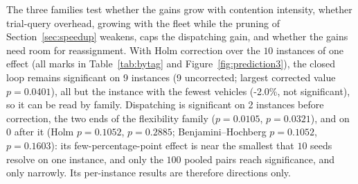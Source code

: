 \documentclass[manuscript,screen,review]{acmart}
\newcommand{\NCases}{10}
\newcommand{\NSeeds}{10}
\newcommand{\NPairs}{100}
\newcommand{\CellsSigLoop}{9}
\newcommand{\CellsSigLoopAdj}{9}
\newcommand{\CellsSigProbe}{2}
\newcommand{\CellsSigProbeAdj}{0}
\newcommand{\GainLoopStarve}{-2.0\%}     %
\newcommand{\PProbeFlexLoRaw}{=0.0105}
\newcommand{\PProbeFlexLoHolm}{=0.1052}
\newcommand{\PProbeFlexLoBH}{=0.1052}
\newcommand{\PProbeFlexHiRaw}{=0.0321}
\newcommand{\PProbeFlexHiHolm}{=0.2885}
\newcommand{\PProbeFlexHiBH}{=0.1603}
\newcommand{\PLoopCellMax}{=0.0401}
\begin{document}
The three families test whether the gains grow with contention intensity, whether trial-query overhead, growing with the fleet while the pruning of Section~\ref{sec:speedup} weakens, caps the dispatching gain, and whether the gains need room for reassignment.
With Holm correction over the $\NCases$ instances of one effect (all marks in Table~\ref{tab:bytag} and Figure~\ref{fig:prediction3}), the closed loop remains significant on \CellsSigLoopAdj{} instances (\CellsSigLoop{} uncorrected; largest corrected value $p\PLoopCellMax$), all but the instance with the fewest vehicles (\GainLoopStarve{}, not significant), so it can be read by family.
Dispatching is significant on \CellsSigProbe{} instances before correction, the two ends of the flexibility family ($p\PProbeFlexLoRaw$, $p\PProbeFlexHiRaw$), and on \CellsSigProbeAdj{} after it (Holm $p\PProbeFlexLoHolm$, $p\PProbeFlexHiHolm$; Benjamini--Hochberg $p\PProbeFlexLoBH$, $p\PProbeFlexHiBH$): its few-percentage-point effect is near the smallest that $\NSeeds$ seeds resolve on one instance, and only the $\NPairs$ pooled pairs reach significance, and only narrowly.
Its per-instance results are therefore directions only.

\begin{table}[t]
\caption{Per-instance ladder results and the two effects, by family ($n=\NSeeds$ seed pairs per instance). Marks: Holm-corrected two-sided Wilcoxon over the $\NCases$ instances of one effect, $^{*}p<0.05$, $^{**}p<0.01$; $^{\dagger}$ significant only before correction. Negative is better; gains are means of pairwise relative gains, as in Table~\ref{tab:main}.
\texttt{A funnel} also serves as $N_A/N_M=1.5$ and $F=0.6$.}
\label{tab:bytag}
\small

\end{table}
\end{document}
